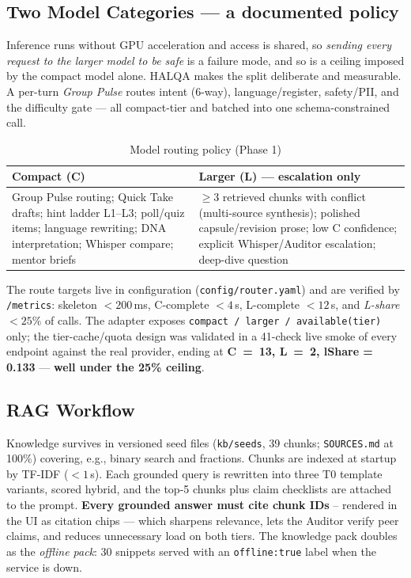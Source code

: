 \documentclass[10pt,twocolumn]{IEEEtran}
\newcommand{\trip}[1]{\textcolor{accg}{\textbf{#1}}}
\begin{document}
\subsection{Two Model Categories --- a documented policy}
Inference runs without GPU acceleration and access is shared, so \emph{sending every request to the larger model to be safe} is a failure mode, and so is a ceiling imposed by the compact model alone. HALQA makes the split deliberate and measurable. A per-turn \emph{Group Pulse} routes intent (6-way), language/register, safety/PII, and the difficulty gate --- all compact-tier and batched into one schema-constrained call.

\begin{table}[t]
\caption{Model routing policy (Phase 1)}
\centering
\footnotesize
\begin{tabular}{@{}p{}p{}@{}}
\toprule
\textbf{Compact (C)} & \textbf{Larger (L) --- escalation only} \\
\midrule
Group Pulse routing; Quick Take drafts; hint ladder L1--L3; poll/quiz items; language rewriting; DNA interpretation; Whisper compare; mentor briefs & $\geq$3 retrieved chunks with conflict (multi-source synthesis); polished capsule/revision prose; low C confidence; explicit Whisper/Auditor escalation; deep-dive question \\
\bottomrule
\end{tabular}
\end{table}

The route targets live in configuration (\texttt{config/router.yaml}) and are verified by \texttt{/metrics}: skeleton $<200$\,ms, C-complete $<4$\,s, L-complete $<12$\,s, and \emph{L-share} $<25\%$ of calls. The adapter exposes \texttt{compact / larger / available(tier)} only; the tier-cache/quota design was validated in a 41-check live smoke of every endpoint against the real provider, ending at \textbf{C~=~13, L~=~2, lShare = 0.133} --- \trip{well under the 25\% ceiling}.

\subsection{RAG Workflow}
Knowledge survives in versioned seed files (\texttt{kb/seeds}, 39 chunks; \texttt{SOURCES.md} at 100\%) covering, e.g., binary search and fractions. Chunks are indexed at startup by TF-IDF ($<1$\,s). Each grounded query is rewritten into three T0 template variants, scored hybrid, and the top-5 chunks plus claim checklists are attached to the prompt. \trip{Every grounded answer must cite chunk IDs} -- rendered in the UI as citation chips --- which sharpens relevance, lets the Auditor verify peer claims, and reduces unnecessary load on both tiers. The knowledge pack doubles as the \emph{offline pack}: 30 snippets served with an \texttt{offline:true} label when the service is down.
\end{document}
